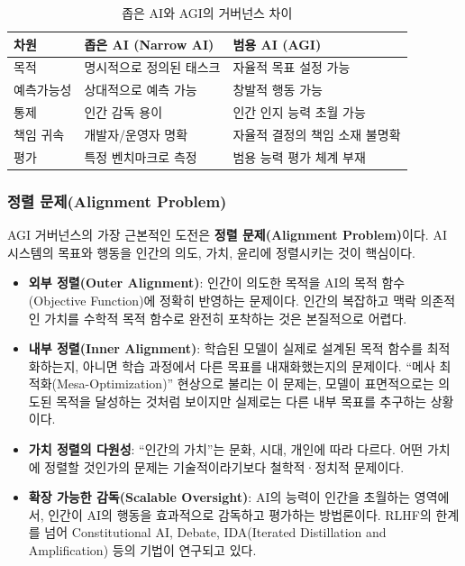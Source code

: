 \begin{table}[htbp]
\centering
\caption{좁은 AI와 AGI의 거버넌스 차이}
\label{tab:20_1}
\begin{tabularx}{\textwidth}{p{2.5cm}Xp{5cm}}
\toprule
\textbf{차원} & \textbf{좁은 AI (Narrow AI)} & \textbf{범용 AI (AGI)} \\
\midrule
목적 & 명시적으로 정의된 태스크 & 자율적 목표 설정 가능 \\
예측가능성 & 상대적으로 예측 가능 & 창발적 행동 가능 \\
통제 & 인간 감독 용이 & 인간 인지 능력 초월 가능 \\
책임 귀속 & 개발자/운영자 명확 & 자율적 결정의 책임 소재 불명확 \\
평가 & 특정 벤치마크로 측정 & 범용 능력 평가 체계 부재 \\
\bottomrule
\end{tabularx}
\end{table}

\subsubsection{정렬 문제(Alignment Problem)}

AGI 거버넌스의 가장 근본적인 도전은 \textbf{정렬 문제(Alignment Problem)}이다. AI 시스템의 목표와 행동을 인간의 의도, 가치, 윤리에 정렬시키는 것이 핵심이다.

\begin{itemize}
 \item \textbf{외부 정렬(Outer Alignment)}: 인간이 의도한 목적을 AI의 목적 함수(Objective Function)에 정확히 반영하는 문제이다. 인간의 복잡하고 맥락 의존적인 가치를 수학적 목적 함수로 완전히 포착하는 것은 본질적으로 어렵다.
 \item \textbf{내부 정렬(Inner Alignment)}: 학습된 모델이 실제로 설계된 목적 함수를 최적화하는지, 아니면 학습 과정에서 다른 목표를 내재화했는지의 문제이다. ``메사 최적화(Mesa-Optimization)'' 현상으로 불리는 이 문제는, 모델이 표면적으로는 의도된 목적을 달성하는 것처럼 보이지만 실제로는 다른 내부 목표를 추구하는 상황이다.
 \item \textbf{가치 정렬의 다원성}: ``인간의 가치''는 문화, 시대, 개인에 따라 다르다. 어떤 가치에 정렬할 것인가의 문제는 기술적이라기보다 철학적·정치적 문제이다.
 \item \textbf{확장 가능한 감독(Scalable Oversight)}: AI의 능력이 인간을 초월하는 영역에서, 인간이 AI의 행동을 효과적으로 감독하고 평가하는 방법론이다. RLHF의 한계를 넘어\cite{casper2023explore} Constitutional AI, Debate, IDA(Iterated Distillation and Amplification) 등의 기법이 연구되고 있다.
\end{itemize}

